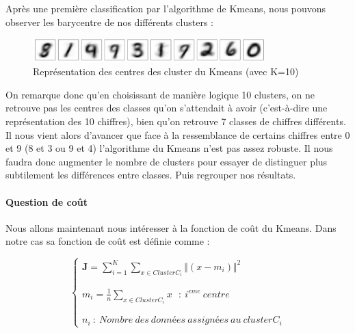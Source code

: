 \documentclass{article}
\begin{document}
Après une première classification par l'algorithme de Kmeans, nous pouvons observer les barycentre de nos différents clusters :

\begin{figure}[H]
	\centering
	\includegraphics[width=0.8\textwidth]{"./Images/centre_clusters.png"}
	\caption{Représentation des centres des cluster du Kmeans (avec K=10)}
	\label{fig:centerClusters}
\end{figure}

On remarque donc qu’en choisissant de manière logique 10 clusters, on ne retrouve pas les centres des classes qu’on s’attendait à avoir (c’est-à-dire une représentation des 10 chiffres), bien qu’on retrouve 7 classes de chiffres différents. Il nous vient alors d'avancer que face à la ressemblance de certains chiffres entre 0 et 9 (8 et 3 ou 9 et 4) l'algorithme du Kmeans n'est pas assez robuste. Il nous faudra donc augmenter le nombre de clusters pour essayer de distinguer plus subtilement les différences entre classes. Puis regrouper nos résultats. \\

\paragraph{Question de coût} Nous allons maintenant nous intéresser à la fonction de coût du Kmeans. Dans notre cas sa fonction de coût est définie comme :

\begin{equation}
	\begin{cases}
		\mathbf{J} =\sum _{i=1}^{K}\sum _{x\in ClusterC_{i}}\Vert ( x-m_{i})\Vert ^{2}\\
		\\\\
		m_{i} =\frac{1}{n}\sum _{x\in ClusterC_{i}} x\ \ \ :\ i^{eme} \ centre\\
		\\\\
		n_{i} \ :\ Nombre\ des\ données\ assignées\ au\ clusterC_{i}
	\end{cases}
\end{equation}
\begin{center}	
\end{center}
\end{document}
